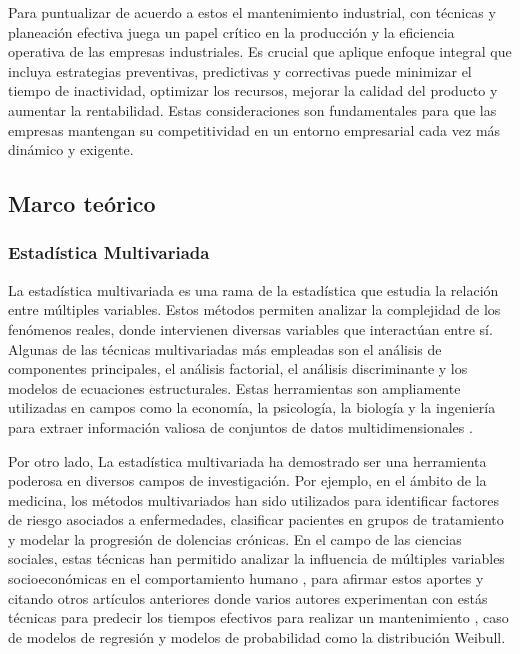 \documentclass[
  11pt,
  bookmarksnumbered]{article}
\begin{document}
Para puntualizar de acuerdo a estos el mantenimiento industrial, con técnicas y planeación efectiva juega un papel crítico en la producción y la eficiencia operativa de las empresas industriales.
Es crucial que aplique enfoque integral que incluya estrategias preventivas, predictivas y correctivas puede minimizar el tiempo de inactividad, optimizar los recursos, mejorar la calidad del producto y aumentar la rentabilidad.
Estas consideraciones son fundamentales para que las empresas mantengan su competitividad en un entorno empresarial cada vez más dinámico y exigente.

\newpage

\hypertarget{marco-teuxf3rico}{%
\subsection{Marco teórico}\label{marco-teuxf3rico}}

\hypertarget{estaduxedstica-multivariada}{%
\subsubsection{Estadística Multivariada}\label{estaduxedstica-multivariada}}

La estadística multivariada es una rama de la estadística que estudia la relación entre múltiples variables.
Estos métodos permiten analizar la complejidad de los fenómenos reales, donde intervienen diversas variables que interactúan entre sí.
Algunas de las técnicas multivariadas más empleadas son el análisis de componentes principales, el análisis factorial, el análisis discriminante y los modelos de ecuaciones estructurales.
Estas herramientas son ampliamente utilizadas en campos como la economía, la psicología, la biología y la ingeniería para extraer información valiosa de conjuntos de datos multidimensionales \textcite{hair}.

Por otro lado, La estadística multivariada ha demostrado ser una herramienta poderosa en diversos campos de investigación.
Por ejemplo, en el ámbito de la medicina, los métodos multivariados han sido utilizados para identificar factores de riesgo asociados a enfermedades, clasificar pacientes en grupos de tratamiento y modelar la progresión de dolencias crónicas.
En el campo de las ciencias sociales, estas técnicas han permitido analizar la influencia de múltiples variables socioeconómicas en el comportamiento humano \textcite{Tabachnick2013}, para afirmar estos aportes y citando otros artículos anteriores donde varios autores experimentan con estás técnicas para predecir los tiempos efectivos para realizar un mantenimiento , caso de modelos de regresión y modelos de probabilidad como la distribución Weibull.
\end{document}
